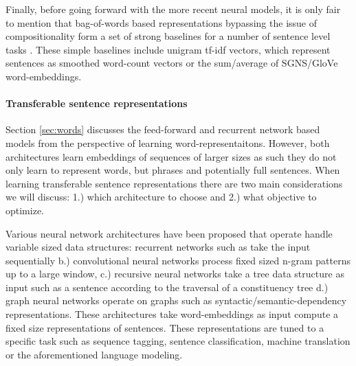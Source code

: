 Finally, before going forward with the more recent neural models,
it is only fair to mention that bag-of-words
based representations bypassing the issue of compositionality form a set of strong baselines
for a number of sentence level tasks \cite{hill2016learning}.
These simple baselines include unigram tf-idf vectors, which represent sentences as
smoothed word-count vectors or the sum/average of SGNS/GloVe word-embeddings.

\paragraph{Transferable sentence representations}
\label{sec:sentence}

Section \ref{sec:words} discusses the feed-forward \cite{bengio2003neural}
and recurrent network based models \cite{mikolov2010recurrent} from the perspective
of learning word-representaitons. However, both architectures learn embeddings
of sequences of larger sizes as such they do not only learn to represent
words, but phrases and potentially full sentences. When learning transferable
sentence representations there are two main considerations we will discuss:
1.) which architecture to choose and 2.) what objective to optimize.

Various neural network architectures have been proposed that operate
handle variable sized data structures: recurrent networks such as
take the input sequentially
b.) convolutional neural networks
\cite{kalchbrenner2014convolutional,zhang2015character,conneau2016very,chen2013learning}
process fixed sized n-gram patterns up to a large window,
c.) recursive neural networks \cite{goller1996learning.socher2011parsing,tai2015improved}
take a tree data structure as input such as a sentence according to the traversal of a
constituency tree d.) graph neural networks operate on graphs \cite{marcheggiani2017encoding} such as
syntactic/semantic-dependency representations.
These architectures take word-embeddings as input compute a fixed size representations of
sentences. These representations are tuned to a specific task such as sequence tagging,
sentence classification, machine translation or the aforementioned language modeling.


